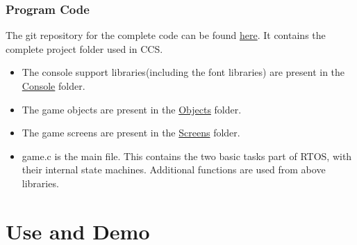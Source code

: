 \documentclass[a4paper,12pt,oneside]{book}
\begin{document}
\subsection{Program Code}
\qquad The git repository for the complete code can be found \href{https://github.com/eYSIP-2017/eYSIP-2017_Game_Development-TI-RTOS/tree/master/Documentation/Breakout/Breakout\%20-\%20Code/Implemented\%20Code}{here}. It contains the complete project folder used in CCS. 
\begin{itemize}
  \item The console support libraries(including the font libraries) are present in the \href{https://github.com/eYSIP-2017/eYSIP-2017_Game_Development-TI-RTOS/tree/master/Documentation/Breakout/Breakout\%20-\%20Code/Implemented\%20Code/Console}{Console} folder. 
  \item The game objects are present in the \href{https://github.com/eYSIP-2017/eYSIP-2017_Game_Development-TI-RTOS/tree/master/Documentation/Breakout/Breakout\%20-\%20Code/Implemented\%20Code/Objects}{Objects} folder.
    \item The game screens are present in the \href{https://github.com/eYSIP-2017/eYSIP-2017_Game_Development-TI-RTOS/tree/master/Documentation/Breakout/Breakout\%20-\%20Code/Implemented\%20Code/Screens}{Screens} folder.
  \item game.c is the main file. This contains the two basic tasks part of RTOS, with their internal state machines. Additional functions are used from above libraries.
\end{itemize}
\chapter{Use and Demo}
\end{document}
